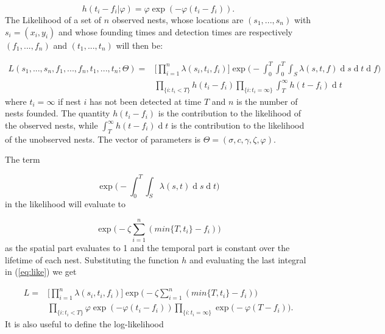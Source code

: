 \documentclass{article}
\renewcommand{\d}[1]{\ensuremath{\operatorname{d}\!{#1}}}
\begin{document}
\begin{equation*}
    h(t_{i} - f_{i} | \varphi) = \varphi \exp (- \varphi(t_{i} - f_{i})).
\end{equation*}
The Likelihood of a set of $n$ {\color{red} observed nests, whose locations are} $(s_{1}, ... , s_{n})$ with $s_i = (x_i, y_i)$ {\color{red}and whose founding times and detection times are respectively} $(f_{1}, ... , f_{n})$ and $(t_{1},  ... , t_{n})$ will then be:

\begin{equation} \label{eq:like}
    \begin{aligned}
        L(s_{1}, ..., s_{n}, f_{1}, ..., f_{n}, t_{1}, ..., t_{n} ; \Theta) = & \Bigg[ \prod_{i = 1}^{n} \lambda(s_{i}, t_{i}, f_{i}) \Bigg] \exp \Bigg(- \int_{0}^{T} \int_{0}^{T} \int_{S} \lambda(s, t, f) \d s \d t \d f \Bigg) \\ 
        & \prod_{\{ i : t_{i} < T \} } h(t_{i} - f_{i}) \prod_{ \{ i : t_{i} = \infty \} } \int_{T}^{\infty} h(t - f_{i}) \d t
    \end{aligned}
\end{equation}
where $t_{i} = \infty$ if nest $i$ has not been detected at time $T$ and $n$ is the number of nests founded. The quantity $h(t_{i} - f_{i})$ is the contribution {\color{red} to the likelihood} of the observed nests, while $\int_{T}^{\infty} h(t - f_{i}) \d t$ is the contribution {\color{red} to the likelihood} of the unobserved nests. The vector of parameters is $\Theta = ( \sigma, c, \gamma, \zeta, \varphi)$.

The term 

\begin{equation*}
    \exp \bigg(- \int_{0}^{T} \int_{S} \lambda(s, t)\d s \d t \bigg)
\end{equation*}
in the likelihood will evaluate to 

\begin{equation*}
    \exp \bigg(- \zeta \sum_{i=1}^{n} (min\{ T, t_i \} - f_i) \bigg)
\end{equation*}
as the spatial part evaluates to 1 and the temporal part is constant over the lifetime of each nest. Substituting the function $h$ and evaluating the last integral in (\ref{eq:like}) we get

\begin{equation*}
    \begin{aligned}
        L = & \Bigg[ \prod_{i = 1}^{n} \lambda(s_{i}, t_{i}, f_{i}) \Bigg] \exp \bigg(- \zeta \sum_{i=1}^{n} (min\{ T, t_i \} - f_i) \bigg) \\ 
        & \prod_{\{ i : t_{i} < T \} } \varphi \exp (- \varphi (t_{i} - f_{i})) \prod_{ \{ i : t_{i} = \infty \} } \exp \bigg( - \varphi(T - f_{i}) \bigg).
    \end{aligned}
\end{equation*}
It is also useful to define the log-likelihood
\end{document}
